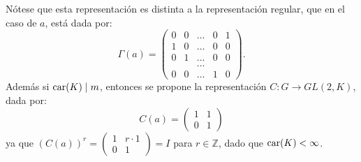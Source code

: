 \begin{ejemplo}
Nótese que esta representación es distinta a la representación regular, que en \nopagebreak[0] el caso de $a$, está dada por: 
\begin{equation*} \Gamma(a) = \begin{pmatrix}
0 & 0 & \dots & 0 & 1 \\
1 & 0 & \dots & 0 & 0\\
0 & 1 & \dots & 0 & 0\\
 &  &  \dots &  &  \\
 0 & 0 & \dots & 1 & 0
\end{pmatrix}. \end{equation*}
\indent Además si $\operatorname{car}(K) \mid m$, entonces se propone la representación $C \colon G \to GL(2,K)$, dada por:
\begin{equation*}
C(a) = \begin{pmatrix}
1 & 1\\
0 & 1
\end{pmatrix} 
\end{equation*}
 ya que $(C(a))^r = \begin{pmatrix}
1 & r\cdot 1\\
0 & 1
\end{pmatrix} = I$ para $r \in \mathds{Z}$, dado que $\operatorname{car}(K) < \infty $.
\end{ejemplo} 
